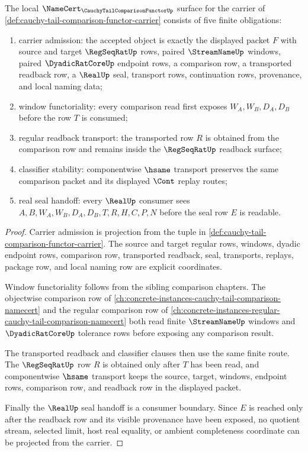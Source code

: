 \begin{theorem}
\label{thm:cauchy-tail-comparison-functor-namecert-obligations}
The local $\NameCert_{\CauchyTailComparisonFunctorUp}$ surface for the carrier of \autoref{def:cauchy-tail-comparison-functor-carrier} consists of five finite obligations:
\begin{enumerate}
\item carrier admission: the accepted object is exactly the displayed packet $F$ with source and target $\RegSeqRatUp$ rows, paired $\StreamNameUp$ windows, paired $\DyadicRatCoreUp$ endpoint rows, a comparison row, a transported readback row, a $\RealUp$ seal, transport rows, continuation rows, provenance, and local naming data;
\item window functoriality: every comparison read first exposes $W_A,W_B,D_A,D_B$ before the row $T$ is consumed;
\item regular readback transport: the transported row $R$ is obtained from the comparison row and remains inside the $\RegSeqRatUp$ readback surface;
\item classifier stability: componentwise $\hsame$ transport preserves the same comparison packet and its displayed $\Cont$ replay routes;
\item real seal handoff: every $\RealUp$ consumer sees $A,B,W_A,W_B,D_A,D_B,T,R,H,C,P,N$ before the seal row $E$ is readable.
\end{enumerate}
\end{theorem}
\begin{proof}
Carrier admission is projection from the tuple in \autoref{def:cauchy-tail-comparison-functor-carrier}. The source and target regular rows, windows, dyadic endpoint rows, comparison row, transported readback, seal, transports, replays, package row, and local naming row are explicit coordinates.

Window functoriality follows from the sibling comparison chapters. The objectwise comparison row of \autoref{ch:concrete-instances-cauchy-tail-comparison-namecert} and the regular comparison row of \autoref{ch:concrete-instances-regular-cauchy-tail-comparison-namecert} both read finite $\StreamNameUp$ windows and $\DyadicRatCoreUp$ tolerance rows before exposing any comparison result.

The transported readback and classifier clauses then use the same finite route. The $\RegSeqRatUp$ row $R$ is obtained only after $T$ has been read, and componentwise $\hsame$ transport keeps the source, target, windows, endpoint rows, comparison row, and readback row in the displayed packet.

Finally the $\RealUp$ seal handoff is a consumer boundary. Since $E$ is reached only after the readback row and its visible provenance have been exposed, no quotient stream, selected limit, host real equality, or ambient completeness coordinate can be projected from the carrier.
\end{proof}

